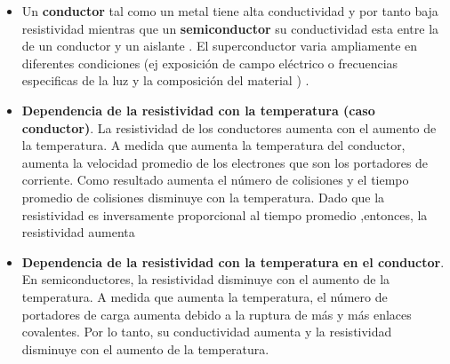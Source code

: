 \documentclass[a4paper,12pt]{article}
\begin{document}
\begin{itemize}
\item Un \textbf{conductor}  tal como un metal tiene alta conductividad y por tanto baja resistividad mientras que un \textbf{semiconductor} su conductividad esta entre la de un conductor y un aislante . El superconductor varia ampliamente en diferentes condiciones (ej exposición de campo eléctrico o frecuencias especificas de la luz y la composición del material ) . 

\item \textbf{Dependencia de la resistividad con la temperatura (caso conductor)}. La resistividad de los conductores aumenta con el aumento de la temperatura. A medida que aumenta la temperatura del conductor, aumenta la velocidad promedio de los electrones que son los portadores de corriente. Como resultado aumenta el número de colisiones y el tiempo promedio de colisiones disminuye con la temperatura. Dado que la resistividad es inversamente proporcional al tiempo promedio ,entonces, la resistividad aumenta


\item \textbf{ Dependencia de la resistividad con la temperatura en el conductor}.
En semiconductores, la resistividad disminuye con el aumento de la temperatura. A medida que aumenta la temperatura, el número de portadores de carga aumenta debido a la ruptura de más y más enlaces covalentes. Por lo tanto, su conductividad aumenta y la resistividad disminuye con el aumento de la temperatura.


\end{itemize}
\end{document}
